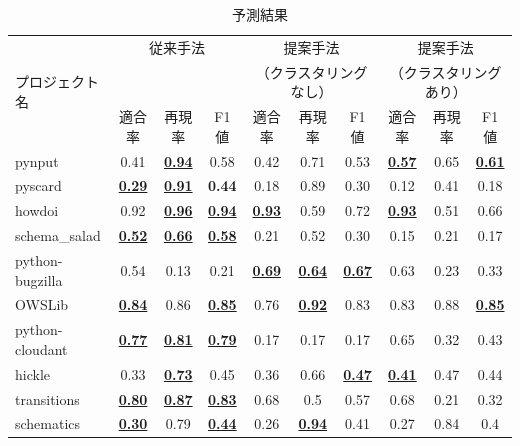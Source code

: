 \documentclass[T,J]{fose} %
\begin{document}
\begin{table}[t]
    \centering
    \caption{予測結果}
    \label{PrevPrediction}
    \begin{tabular}{l|ccc|ccc|ccc}
         \hline
         \multirow{3}{*}{プロジェクト名}&\multicolumn{3}{c|}{従来手法} & \multicolumn{3}{c|}{提案手法} & \multicolumn{3}{c}{提案手法}\\
         &\multicolumn{3}{c|}{} & \multicolumn{3}{c|}{（クラスタリングなし）} & \multicolumn{3}{c}{（クラスタリングあり）}\\ \cline{2-10}
          & 適合率 & 再現率 & F1値 & 適合率 & 再現率 & F1値 & 適合率 & 再現率 & F1値\\ \hline
         \hline %
            pynput & 0.41 & \textbf{\underline{0.94}} & 0.58 & 0.42 & 0.71 & 0.53 & \textbf{\underline{0.57}} & 0.65 & \textbf{\underline{0.61}}\\
            pyscard & \textbf{\underline{0.29}} & \textbf{\underline{0.91}} & \textbf{0.44} & 0.18 & 0.89 & 0.30 & 0.12 & 0.41 & 0.18\\
            howdoi & 0.92 & \textbf{\underline{0.96}} & \textbf{\underline{0.94}} & \textbf{\underline{0.93}} & 0.59 & 0.72 & \textbf{\underline{0.93}} & 0.51 & 0.66\\
            schema\_salad & \textbf{\underline{0.52}} & \textbf{\underline{0.66}} & \textbf{\underline{0.58}} & 0.21 & 0.52 & 0.30 & 0.15 & 0.21 & 0.17\\
            python-bugzilla & 0.54 & 0.13 & 0.21 & \textbf{\underline{0.69}} & \textbf{\underline{0.64}} & \textbf{\underline{0.67}} & 0.63 & 0.23 & 0.33\\
            OWSLib & \textbf{\underline{0.84}} & 0.86 & \textbf{\underline{0.85}} & 0.76 & \textbf{\underline{0.92}} & 0.83 & 0.83 & 0.88 & \textbf{\underline{0.85}}\\
            python-cloudant & \textbf{\underline{0.77}} & \textbf{\underline{0.81}} & \textbf{\underline{0.79}} & 0.17 & 0.17 & 0.17 & 0.65 & 0.32 & 0.43\\
            hickle & 0.33 & \textbf{\underline{0.73}} & 0.45 & 0.36 & 0.66 & \textbf{\underline{0.47}} & \textbf{\underline{0.41}} & 0.47 & 0.44\\
            transitions & \textbf{\underline{0.80}} & \textbf{\underline{0.87}} & \textbf{\underline{0.83}} & 0.68 & 0.5 & 0.57 & 0.68 & 0.21 & 0.32\\
            schematics & \textbf{\underline{0.30}} & 0.79 & \textbf{\underline{0.44}} & 0.26 & \textbf{\underline{0.94}} & 0.41 & 0.27 & 0.84 & 0.4\\
    \hline
    \end{tabular}
\end{table}
\end{document}
